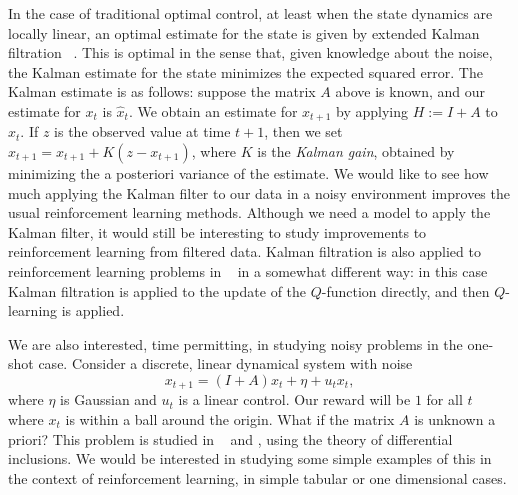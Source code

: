 \documentclass{article}
\begin{document}
In the case of traditional optimal control, at least when the state dynamics are locally linear, an  optimal estimate for the state is given by extended Kalman filtration ~\cite{welchBishop}. This is optimal in the sense that, given knowledge about the noise, the Kalman estimate for the state minimizes the expected squared error. The Kalman estimate is as follows: suppose the matrix $A$ above is known, and our estimate for $x_t$ is $\hat x_t$. We obtain an estimate for $x_{t+1}$ by applying $H := I+A$ to $\hat x_t$. If $z$ is the observed value at time $t+1$, then we set $\hat x_{t+1} = x_{t+1} + K (z - x_{t+1})$, where $K$ is the {\em Kalman gain}, obtained by minimizing the a posteriori variance of the estimate. We would like to see how much applying the Kalman filter to our data in a noisy environment improves the usual reinforcement learning methods. Although we need a model to apply the Kalman filter, it would still be interesting to study improvements to reinforcement learning from filtered data. Kalman filtration is also applied to reinforcement learning problems in ~\cite{trippSchacter} in a somewhat different way: in this case Kalman filtration is applied to the update of the $Q$-function directly, and then $Q$-learning is applied.

We are also interested, time permitting, in studying noisy problems in the one-shot case. Consider a discrete, linear dynamical system with noise
\[
    x_{t+1} = (I + A) x_t + \eta + u_t x_t,
\]
where $\eta$ is Gaussian and $u_t$ is a linear control. Our reward will be $1$ for all $t$ where $x_t$ is within a ball around the origin. What if the matrix $A$ is unknown a priori? This problem is studied in ~\cite{ornikIsraelTopcu} and \cite{ahmadiIsraelTopcu}, using the theory of differential inclusions. We would be interested in studying some simple examples of this in the context of reinforcement learning, in simple tabular or one dimensional cases. 

{}


 

\end{document}
